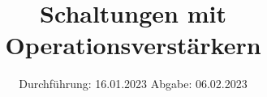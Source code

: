 

\subject{Versuch Nr.V51}
\title{Schaltungen mit Operationsverstärkern}
\date{%
  Durchführung: 16.01.2023
  \hspace{3em}
  Abgabe: 06.02.2023
}



\maketitle
\thispagestyle{empty}
\tableofcontents
\newpage 







\newpage

\nocite{*}

\printbibliography{}


